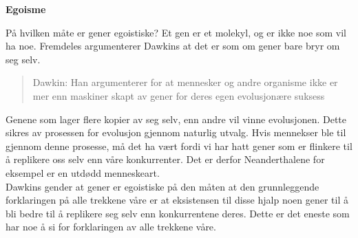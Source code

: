 \documentclass[11pt, a4paper]{article}
\newenvironment{sectionbox}[1][]{%
    \begin{sectionboxinner}
    \textbf{\large #1}
    \vspace{1pt}
    \newline
}{%
    \end{sectionboxinner}
}
\begin{document}
\begin{sectionbox}[Egoisme]
    \begin{flushleft}
        På hvilken måte er gener egoistiske? Et gen er et molekyl, og er ikke noe som vil ha noe. Fremdeles argumenterer Dawkins at det er som om gener bare bryr om seg selv. \\
        
        \begin{quote}
            Dawkin: Han argumenterer for at mennesker og andre organisme ikke er mer enn maskiner skapt av gener for deres egen evolusjonære suksess
        \end{quote}
        Genene som lager flere kopier av seg selv, enn andre vil vinne evolusjonen. Dette sikres av prosessen for evolusjon gjennom naturlig utvalg. Hvis mennekser ble til gjennom denne prosesse, må det ha vært fordi vi har hatt gener som er flinkere til å replikere oss selv enn våre konkurrenter. Det er derfor Neanderthalene for eksempel er en utdødd menneskeart. \\

        Dawkins gender at gener er egoistiske på den måten at den grunnleggende forklaringen på alle trekkene våre er at eksistensen til disse hjalp noen gener til å bli bedre til å replikere seg selv enn konkurrentene deres. Dette er det eneste som har noe å si for forklaringen av alle trekkene våre.
    \end{flushleft}
\end{sectionbox}
\end{document}
